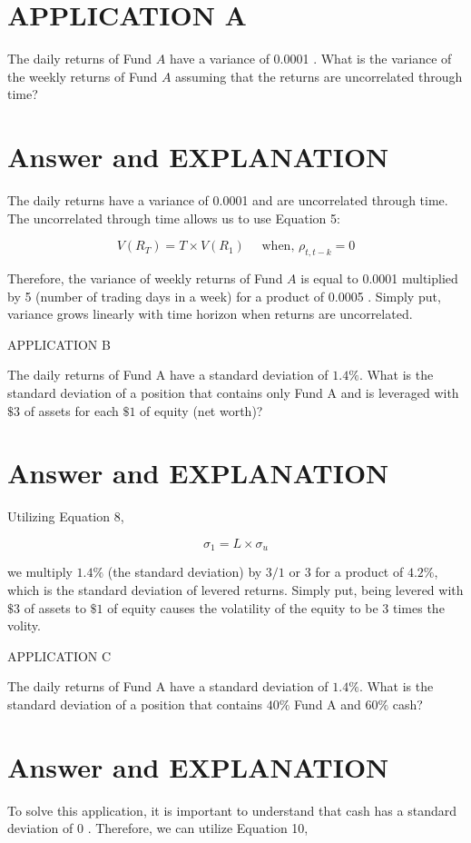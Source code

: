 \documentclass[11pt]{article}
\begin{document}
\section*{APPLICATION A}
The daily returns of Fund $A$ have a variance of 0.0001 . What is the variance of the weekly returns of Fund $A$ assuming that the returns are uncorrelated through time?

\section*{Answer and EXPLANATION}
The daily returns have a variance of 0.0001 and are uncorrelated through time. The uncorrelated through time allows us to use Equation 5:

$$
V\left(R_{T}\right)=T \times V\left(R_{1}\right) \quad \text { when, } \rho_{t, t-k}=0
$$

Therefore, the variance of weekly returns of Fund $A$ is equal to 0.0001 multiplied by 5 (number of trading days in a week) for a product of 0.0005 . Simply put, variance grows linearly with time horizon when returns are uncorrelated.

APPLICATION B

The daily returns of Fund A have a standard deviation of $1.4 \%$. What is the standard deviation of a position that contains only Fund A and is leveraged with $\$ 3$ of assets for each $\$ 1$ of equity (net worth)?

\section*{Answer and EXPLANATION}
Utilizing Equation 8,

$$
\sigma_{1}=L \times \sigma_{u}
$$

we multiply $1.4 \%$ (the standard deviation) by $3 / 1$ or 3 for a product of $4.2 \%$, which is the standard deviation of levered returns. Simply put, being levered with $\$ 3$ of assets to $\$ 1$ of equity causes the volatility of the equity to be 3 times the volity.

APPLICATION C

The daily returns of Fund A have a standard deviation of $1.4 \%$. What is the standard deviation of a position that contains $40 \%$ Fund A and $60 \%$ cash?

\section*{Answer and EXPLANATION}
To solve this application, it is important to understand that cash has a standard deviation of 0 . Therefore, we can utilize Equation 10,
\end{document}
